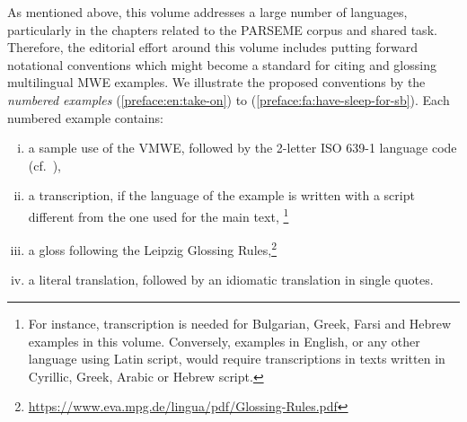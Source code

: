 \documentclass[output=paper,
modfonts,
]{langscibook}
\begin{document}
 As mentioned above, this volume addresses a large number of languages, particularly in the chapters related to the PARSEME corpus and shared task. Therefore, the editorial effort around this volume includes putting forward notational conventions which might become a standard for citing and glossing multilingual MWE examples.
We illustrate the proposed conventions by the \emph{numbered examples}  (\ref{preface:en:take-on}) to (\ref{preface:fa:have-sleep-for-sb}). Each numbered example contains:%
\begin{enumerate}[(i)]%
\item\label{ex-line:use} a sample use of the VMWE, followed by the 2-letter ISO 639-1 language code (cf.~),

\item\label{ex-line:transcription} a transcription, if the language of the example is written with a script different from the one used for the main text,
\footnote{For instance, transcription is needed for Bulgarian, Greek, Farsi and Hebrew examples in this volume. Conversely, examples in English, or any other language using Latin script, would require transcriptions %
in texts written in Cyrillic, Greek, Arabic or Hebrew script.}

\item\label{ex-line:gloss} a gloss %
following 
the Leipzig Glossing Rules,\footnote{\url{https://www.eva.mpg.de/lingua/pdf/Glossing-Rules.pdf}} 

\item\label{ex-line:trans} a literal translation, followed by an idiomatic translation in single quotes. 
\end{enumerate}
\end{document}

